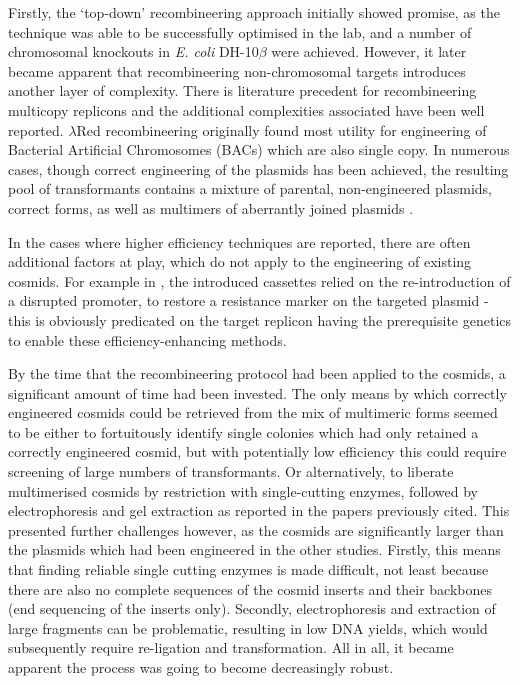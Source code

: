 Firstly, the `top-down' recombineering approach initially showed promise, as the technique was able to be successfully optimised in the lab, and a number of chromosomal knockouts in \emph{E. coli} DH-10$\beta$ were achieved. However, it later became apparent that recombineering non-chromosomal targets introduces another layer of complexity. There is literature precedent for recombineering multicopy replicons and the additional complexities associated have been well reported. $\lambda$Red recombineering originally found most utility for engineering of Bacterial Artificial Chromosomes (BACs) which are also single copy. In numerous cases, though correct engineering of the plasmids has been achieved, the resulting pool of transformants contains a mixture of parental, non-engineered plasmids, correct forms, as well as multimers of aberrantly joined plasmids \citep{Thomason2007, Lee2001a, Yosef2004, Vetcher2005}.

In the cases where higher efficiency techniques are reported, there are often additional factors at play, which do not apply to the engineering of existing cosmids. For example in \cite{Yosef2004}, the introduced cassettes relied on the re-introduction of a disrupted promoter, to restore a resistance marker on the targeted plasmid - this is obviously predicated on the target replicon having the prerequisite genetics to enable these efficiency-enhancing methods.

By the time that the recombineering protocol had been applied to the cosmids, a significant amount of time had been invested. The only means by which correctly engineered cosmids could be retrieved from the mix of multimeric forms seemed to be either to fortuitously identify single colonies which had only retained a correctly engineered cosmid, but with potentially low efficiency this could require screening of large numbers of transformants. Or alternatively, to liberate multimerised cosmids by restriction with single-cutting enzymes, followed by electrophoresis and gel extraction as reported in the papers previously cited. This presented further challenges however, as the cosmids are significantly larger than the plasmids which had been engineered in the other studies. Firstly, this means that finding reliable single cutting enzymes is made difficult, not least because there are also no complete sequences of the cosmid inserts and their backbones (end sequencing of the inserts only). Secondly, electrophoresis and extraction of large fragments can be problematic, resulting in low DNA yields, which would subsequently require re-ligation and transformation. All in all, it became apparent the process was going to become decreasingly robust.

